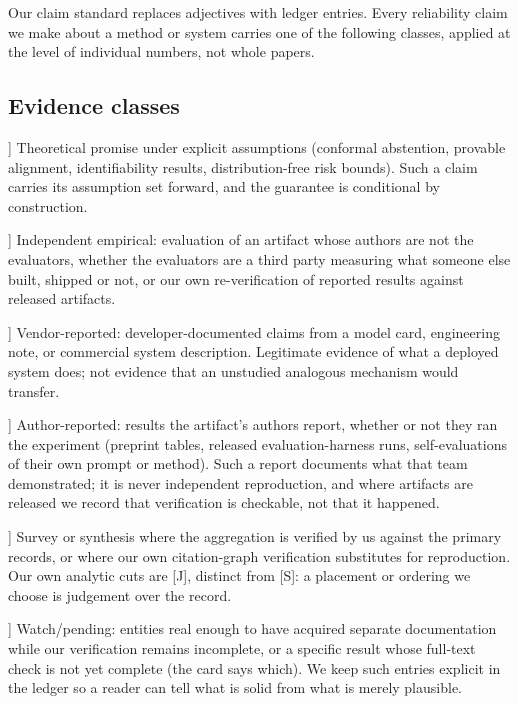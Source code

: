 Our claim standard replaces adjectives with ledger entries. Every reliability claim we make about
a method or system carries one of the following classes, applied at the level of individual
numbers, not whole papers.

\subsection{Evidence classes}
\begin{description}[leftmargin=1.5em, itemsep=1pt]
\item[[T]] Theoretical promise under explicit assumptions (conformal abstention, provable
alignment, identifiability results, distribution-free risk bounds). Such a claim carries its
assumption set forward, and the guarantee is conditional by construction.
\item[[E]] Independent empirical: evaluation of an artifact whose authors are not the evaluators,
whether the evaluators are a third party measuring what someone else built, shipped or not, or our
own re-verification of reported results against released artifacts.
\item[[V]] Vendor-reported: developer-documented claims from a model card, engineering note, or
commercial system description. Legitimate evidence of what a deployed system does; not evidence
that an unstudied analogous mechanism would transfer.
\item[[A]] Author-reported: results the artifact's authors report, whether or not they ran the
experiment (preprint tables, released evaluation-harness runs, self-evaluations of their own
prompt or method). Such a report documents what that team demonstrated; it is never independent
reproduction, and where artifacts are released we record that verification is checkable, not that it happened.
\item[[S]] Survey or synthesis where the aggregation is verified by us against the primary
records, or where our own citation-graph verification substitutes for reproduction. Our own
analytic cuts are [J], distinct from [S]: a placement or ordering we choose is judgement over the
record.
\item[[W]] Watch/pending: entities real enough to have acquired separate documentation while
our verification remains incomplete, or a specific result whose full-text check is not yet
complete (the card says which). We keep such entries explicit in the ledger so a reader can tell
what is solid from what is merely plausible.
\end{description}

